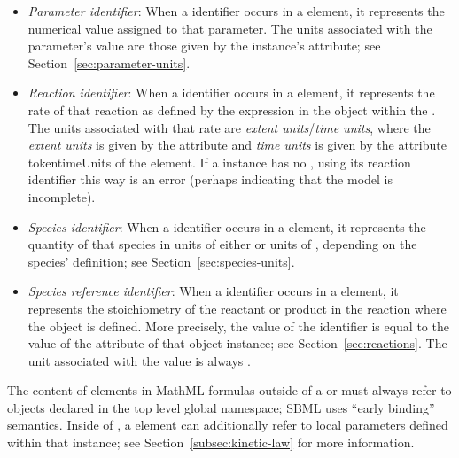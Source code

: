 \begin{itemize}
\begin{itemize}
  \item \emph{Parameter identifier}: When a \Parameter identifier
    occurs in a  element, it represents the numerical
    value assigned to that parameter.  The units
      associated with the parameter's value are those given by the
      \Parameter instance's  attribute; see
    Section~\ref{sec:parameter-units}.

  \item \emph{Reaction identifier}: When a \Reaction identifier
    occurs in a  element, it represents the rate of that
    reaction as defined by the  expression in the
    \KineticLaw object within the \Reaction.  The units associated
    with that rate are \emph{extent units}/\emph{time units},
    where the \emph{extent units} is given by the attribute
     and \emph{time units} is given by the
    attribute token{timeUnits} of the \Model element. If a
    \Reaction instance has no \KineticLaw , using its reaction
    identifier this way is an error (perhaps indicating that the
    model is incomplete). 
    
  \item \emph{Species identifier}: When a \Species identifier
    occurs in a  element, it represents the quantity of
    that species in units of either  or units of , depending
      on the species' definition; see
    Section~\ref{sec:species-units}.

  \item \emph{Species reference identifier}: When a
    \SpeciesReference identifier occurs in a  element,
    it represents the stoichiometry of the reactant or product in
    the reaction where the \SpeciesReference object is defined.
    More precisely, the value of the \SpeciesReference
    identifier is equal to the value of the 
    attribute of that \SpeciesReference object instance; see
    Section~\ref{sec:reactions}.  The unit associated with the
    value is always .
    
  \end{itemize}

\end{itemize}

The content of  elements in MathML formulas outside of a
\KineticLaw or \FunctionDefinition must always refer to objects
declared in the top level global namespace; \ie SBML uses ``early
binding'' semantics.  Inside of \KineticLaw, a  element
can additionally refer to local parameters defined within that
\KineticLaw instance; see Section~\ref{subsec:kinetic-law} for
more information.


